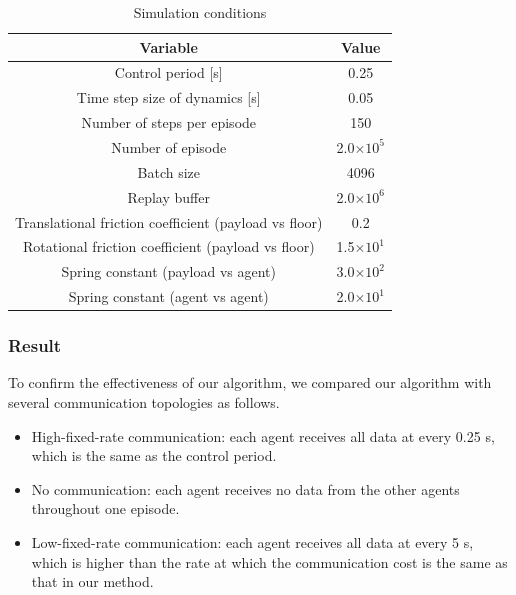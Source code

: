 \documentclass[letterpaper, 10 pt, conference]{ieeeconf} %
\begin{document}
\begin{table}[!bp]
\caption{Simulation conditions}
\label{sim2_condition}
\vspace{-2mm}
\centering
\renewcommand{\arraystretch}{1.1}
\begin{tabular}{cc}
\hline
Variable & Value \\
\hline
Control period [s] & 0.25 \\
Time step size of dynamics [s] & 0.05 \\ 
Number of steps per episode & 150 \\
Number of episode & 2.0$\times10^{5}$ \\
Batch size & 4096 \\
Replay buffer & 2.0$\times10^6$ \\
Translational friction coefficient (payload vs floor) & 0.2 \\
Rotational friction coefficient (payload vs floor) & 1.5$\times10^{1}$ \\
Spring constant (payload vs agent) & 3.0$\times10^{2}$ \\
Spring constant (agent vs agent) & 2.0$\times10^{1}$ \\
\hline
\end{tabular}
\end{table}

\subsubsection{Result}
To confirm the effectiveness of our algorithm, we compared our algorithm with several communication topologies as follows.
\begin{itemize}
\item High-fixed-rate communication: each agent receives all data at every 0.25 s, which is the same as the control period.
\item No communication: each agent receives no data from the other agents throughout one episode. 
\item Low-fixed-rate communication: each agent receives all data at every 5 s, which is higher than the rate at which the communication cost is the same as that in our method.
\end{itemize}
\end{document}
